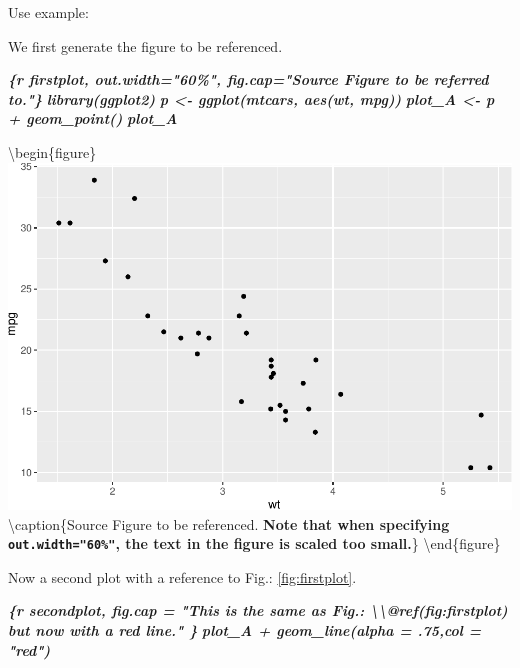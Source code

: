 \documentclass[
  a4paper,
  twoside,
  openright]{book}
\newenvironment{Shaded}{\begin{snugshade}}{\end{snugshade}}
\newcommand{\InformationTok}[1]{\textcolor[rgb]{0.56,0.35,0.01}{\textbf{\textit{#1}}}}
\theoremstyle{definition}
\theoremstyle{definition}
\theoremstyle{definition}
\theoremstyle{definition}
\theoremstyle{remark}
\begin{document}
Use example:

We first generate the figure to be referenced.

\begin{Shaded}
\begin{Highlighting}[]
\InformationTok{\textasciigrave{}\textasciigrave{}\textasciigrave{}\{r firstplot, out.width="60\%", fig.cap="Source Figure to be referred to."\}}
\InformationTok{library(ggplot2)}
\InformationTok{p \textless{}{-} ggplot(mtcars, aes(wt, mpg))}
\InformationTok{plot\_A \textless{}{-} p + geom\_point()}
\InformationTok{plot\_A}
\InformationTok{\textasciigrave{}\textasciigrave{}\textasciigrave{}}
\end{Highlighting}
\end{Shaded}

\textbackslash begin\{figure\}
\includegraphics[width=0.6\linewidth]{0206-Rmd-Figure_files/figure-latex/firstplot-1} \textbackslash caption\{Source Figure to be referenced. \textbf{Note that when specifying \texttt{out.width="60\%"}, the text in the figure is scaled too small.}\}\label{fig:firstplot}
\textbackslash end\{figure\}

Now a second plot with a reference to Fig.: \ref{fig:firstplot}.

\begin{Shaded}
\begin{Highlighting}[]
\InformationTok{\textasciigrave{}\textasciigrave{}\textasciigrave{}\{r secondplot, fig.cap = "This is the same as Fig.: \textbackslash{}\textbackslash{}@ref(fig:firstplot) but now with a red line." \}}
\InformationTok{plot\_A + geom\_line(alpha = .75,col = "red")}
\InformationTok{\textasciigrave{}\textasciigrave{}\textasciigrave{}}
\end{Highlighting}
\end{Shaded}
\end{document}
